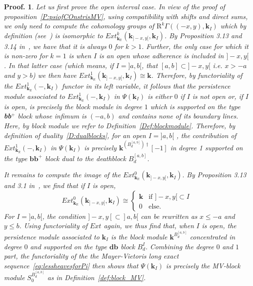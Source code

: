 \documentclass[a4paper, english, 11pt]{article}
\newcommand{\kk}[0]{\textbf{k}}
\newcommand{\0}{\vec{0}}
\newcommand{\R}[0]{\mathbb{R}}
\newcommand{\Rr}[0]{\text{R}}
\newtheorem*{pf}{Proof.} }
\begin{document}
\begin{pf}Let us first prove the open interval case.
In view of the proof of proposition~\ref{P:psiofCOnstrisMV}, using compatibility with shifts and direct sums, we only need to compute the cohomology groups of $\Rr^k\Gamma \left ( (-x,y) , \kk_{I}\right )$ which by definition (see~\cite{Kash90}) is isomorphic to 
$Ext^k_{\kk_\R}\left( \kk_{]-x,y[}, \kk_{I }\right) $. 
By Proposition 3.13 and 3.14 in~\cite{Berk18}, we have that it is always $0$ for $k>1$. Further, the only case for which it is non-zero for $k=1$ is when $I$ is an open whose adherence is included in $]-x,y[$. In that latter case (which means, if $I=]a,b[$, that $[a,b]\subset ]-x,y[$ i.e. $x>-a$ and $y>b$) we  then have $Ext^1_{\kk_\R}\left( \kk_{]-x,y[}, \kk_{I }\right) \cong \kk $.  Therefore, by functoriality of the $Ext^1_{\kk_\R}( -, \kk_I)$ functor in its left variable, it follows that the persistence module associated to  
$Ext^1_{\kk_\R}( -, \kk_I)$ in $\Psi(\kk_I)$ is either $0$ if $I$ is not open or, if $I$ is open, is precisely the block module in degree $1$ which is supported on the type \textbf{bb}$^+$ block whose infimum is $(-a,b)$ and contains none of its boundary lines. Here, by block module we refer to Definition~\ref{Def:blockmodule}. Therefore, by definition of duality~\ref{D:dualblocks}, for an open $I=]a,b[$ , the contribution of $Ext^1_{\kk_\R}( -, \kk_I)$ in $\Psi(\kk_I)$ is precisely 
$\kk^{(B_d^{[a,b]})\dag}[-1]$ in degree 1 supported on the type $\textbf{bb}^{+}$ block dual to the deathblock $B_d^{[a,b]}$. 

It remains to compute the image of the $Ext^0_{\kk_\R}\left( \kk_{]-x,y[}, \kk_{I }\right) $. By Proposition 3.13 and 3.1 in~\cite{Berk18}, we find that if $I$ is open, 
$$Ext^0_{\kk_\R}\left( \kk_{]-x,y[}, \kk_{I }\right) \cong \left \{ \begin{array}{ll}
\kk & \mbox{if } ]-x, y[ \subset I \\ 0 & \mbox{else. }
\end{array}\right .$$
For $I=]a,b[$, the condition $]-x,y[ \subset ]a,b[$ can be rewritten as $x\leq -a$ and $y\leq b$.
Using functoriality of $Ext$ again, we thus find that, when $I$ is open, the persistence module associated to $\kk_I$ is the block module $ \kk^{B_d^{[a,b]}}$ concentrated in degree $0$ and supported on the type $\textbf{db}$ block $B_d^I$. Combining the degree $0$ and $1$ part, 
the functoriality of the the Mayer-Vietoris long exact sequence~\eqref{eq:lessheavesforPi} then shows that $\Psi(\kk_I) $ is precisely the MV-block module $S_0^{B_d^{[a,b]}}$ as in Definition~\ref{def:block_MV}.


\end{pf}
\end{document}
